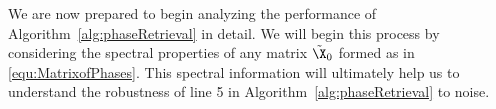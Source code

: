 
We are now prepared to begin analyzing the performance of Algorithm~\ref{alg:phaseRetrieval} in detail.  We will begin this process by considering the spectral properties of any matrix $\tilde{\X}_0$ formed as in \eqref{equ:MatrixofPhases}.  This spectral information will ultimately help us to understand the robustness of line 5 in Algorithm~\ref{alg:phaseRetrieval} to noise.
